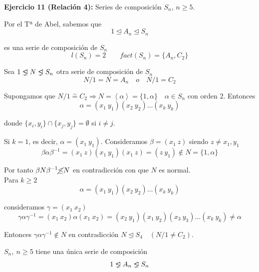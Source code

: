 \documentclass{article}
\newcommand{\unlhdneq}{%
  \mathrel{\ooalign{$\lneq$\cr\raise.22ex\hbox{$\lhd$}\cr}}}
\begin{document}
\textbf{Ejercicio 11 (Relación 4):} Series de composición $S_n$, $n\geq 5$.

Por el Tª de Abel, sabemos que
\begin{equation*}
1\unlhd A_n\unlhd S_n
\end{equation*}

es una serie de composición de $S_n$
\begin{equation*}
l(S_n)=2\qquad fact(S_n)=\{A_n,C_2\}
\end{equation*}

Sea $1\unlhdneq N\unlhdneq S_n$ otra serie de composición de $S_n$ 
\begin{equation*}
N/1=N=A_n\quad o \quad N/1=C_2
\end{equation*}

Supongamos que $N/1\overset{\sim}{=} C_2\Rightarrow N=\left\langle \alpha \right\rangle =\{1,\alpha\} \quad \alpha\in S_n$ con orden 2. Entonces
\begin{equation*}
\alpha=(x_1\:y_1)(x_2\:y_2)\ldots(x_k\:y_k) 
\end{equation*}

donde $\{x_i,y_i\}\cap \{x_j,y_j\}=\emptyset$ si $i\neq j$. 

Si $k=1$, es decir, $\alpha=(x_1\:y_1)$. Consideramos $\beta=(x_1\:z)$ siendo $z\neq x_1,y_1$
\begin{equation*}
\beta\alpha\beta^{-1}=(x_1\:z)(x_1\:y_1)(x_1\:z)=(z\:y_1)\notin N=\{1,\alpha\}
\end{equation*}

Por tanto $\beta N\beta^{-1}\cancel{\leq }N$ en contradicción con que $N$ es normal. \\

Para $k\geq 2$
\begin{equation*}
\alpha=(x_1\:y_1)(x_2\:y_2)\ldots(x_k\:y_k)
\end{equation*}

consideramos $\gamma=(x_1\:x_2)$
\begin{equation*}
\gamma\alpha\gamma^{-1}=(x_1\:x_2)\alpha(x_1\:x_2)=(x_2\:y_1)(x_1\:y_2)(x_3\:y_3)\ldots(x_k\:y_k)\neq \alpha
\end{equation*}

Entonces $\gamma\alpha\gamma^{-1}\notin N$ en contradicción $N\unlhd S_4 \quad (N/1\neq C_2)$. 

$S_n,\:n\geq 5$ tiene una única serie de composición
\begin{equation*}
1\unlhdneq A_n\unlhdneq S_n
\end{equation*}
\end{document}
